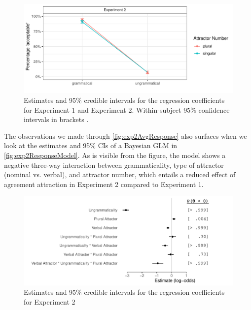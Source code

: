 \documentclass[doc,a4paper,man,natbib,floatsintext,noextraspace]{apa6}\usepackage[]{graphicx}\usepackage[]{color}
\makeatletter
\def\maxwidth{ %
  \ifdim\Gin@nat@width>\linewidth
    \linewidth
  \else
    \Gin@nat@width
  \fi
}
\newenvironment{knitrout}{}{} %
\makeatother
\begin{document}
\begin{knitrout}
\color{fgcolor}\begin{figure}

{\centering \includegraphics[width=\maxwidth]{figure/exp2AvgResponse-1} 

}

\caption{Estimates and 95\% credible intervals for the regression coefficients for Experiment 1 and Experiment 2.  Within-subject 95\% confidence intervals in brackets \cite{Cousineau:2005,Morey:2008}.}\label{fig:exp2AvgResponse}
\end{figure}


\end{knitrout}

The observations we made through \autoref{fig:exp2AvgResponse} also surfaces when we look at the estimates and 95\% CIs of a Bayesian GLM in \autoref{fig:exp2ResponseModel}. As is visible from the figure, the model shows a negative three-way interaction between grammaticality, type of attractor (nominal vs. verbal), and attractor number, which entails a reduced effect of agreement attraction in Experiment 2 compared to Experiment 1. 




\begin{knitrout}
\color{fgcolor}\begin{figure}

{\centering \includegraphics[width=\maxwidth]{figure/exp2ResponseModel-1} 

}

\caption[Estimates and 95\% credible intervals for the regression coefficients for Experiment 2]{Estimates and 95\% credible intervals for the regression coefficients for Experiment 2}\label{fig:exp2ResponseModel}
\end{figure}


\end{knitrout}
\end{document}
